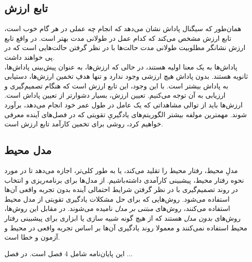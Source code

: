 
\subsection{تابع ارزش}
همان‌طور که سیگنال پاداش نشان می‌دهد که انجام چه عملی در هر گام خوب است، تابع ارزش مشخص می‌کند که کدام عمل در طولانی مدت بهتر است. در واقع تابع ارزش نشانگر مطلوبیت طولانی مدت حالت‌ها با در نظر گرفتن حالت‌هایی است که در پی خواهند داشت.
\\پاداش‌ها به یک معنا اولیه هستند، در حالی که ارزش‌ها، به عنوان پیش‌بینی پاداش‌ها، ثانویه هستند. بدون پاداش هیچ ارزشی وجود ندارد و تنها هدفِ تخمین ارزش‌ها، دستیابی به پاداش بیشتر است. با این وجود، این تابع ارزش است که هنگام تصمیم‌گیری و ارزیابی به آن توجه می‌کنیم.
تعیین ارزش،‌ بسیار دشوارتر از تعیین پاداش است.
ارزش‌ها باید از توالی مشاهداتی که یک عامل در طول عمر خود انجام می‌دهد، برآورد شوند.
مهمترین مولفه بیشتر الگوریتم‌های یادگیریِ تقویتی که در  فصل‌های آینده معرفی خواهیم کرد، روشی برای تخمین کارآمد تابع ارزش است.

\subsection{مدل محیط}

مدلِ محیط، رفتار محیط را تقلید می‌کند، یا به طور کلی‌تر، اجازه می‌دهد تا در مورد نحوه رفتار محیط، پیشبینی کارآمدی داشته‌باشیم. از مدل‌ها برای برنامه‌ریزی و انتخاب در روند تصمیم‌گیری  با در نظر گرفتن شرایط احتمالی آینده بدون تجربه واقعی آن‌ها استفاده می‌شود.
روش‌هایی که برای حل مشکلات یادگیری تقویتی از مدل‌ محیط استفاده می‌کنند، روش‌های
 \textit{مبتنی بر مدل}
نامیده می‌شوند. در مقابل این روش‌ها، روش‌های 
\textit{بدون مدل}
هستند که از هیچ گونه شبیه سازی  یا ابزاری برای پیشبینی رفتار محیط استفاده نمی‌کنند و معمولا روند یادگیری آن‌ها بر اساس تجربه واقعی در محیط و آزمون و خطا است.




این پایان‌نامه شامل 4 فصل است. در فصل ...
